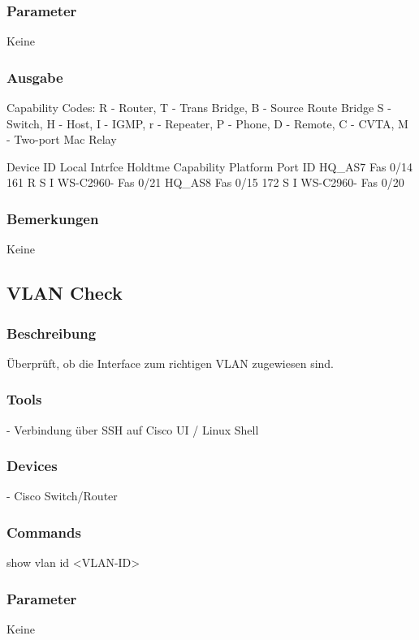 \documentclass[a4,12pt]{scrartcl}
\begin{document}
\subsubsection{Parameter}
Keine
\subsubsection{Ausgabe}
Capability Codes: R - Router, T - Trans Bridge, B - Source Route Bridge\newline
                  S - Switch, H - Host, I - IGMP, r - Repeater, P - Phone,\newline
                  D - Remote, C - CVTA, M - Two-port Mac Relay\newline

Device ID        Local Intrfce     Holdtme    Capability  Platform  Port ID\newline
HQ_AS7           Fas 0/14          161             R S I  WS-C2960- Fas 0/21\newline
HQ_AS8           Fas 0/15          172              S I   WS-C2960- Fas 0/20\newline
\subsubsection{Bemerkungen}
Keine





\subsection{VLAN Check}
\subsubsection{Beschreibung}
Überprüft, ob die Interface zum richtigen VLAN zugewiesen sind.
\subsubsection{Tools}
- Verbindung über SSH auf Cisco UI / Linux Shell
\subsubsection{Devices}
- Cisco Switch/Router
\subsubsection{Commands}
show vlan id <VLAN-ID>
\subsubsection{Parameter}
Keine
\end{document}
